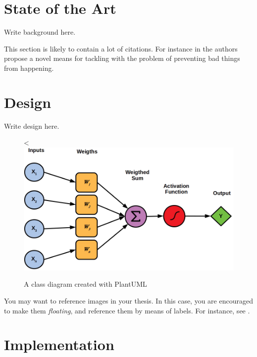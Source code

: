 \documentclass[12pt,a4paper,openright,twoside]{book}
\begin{document}
\chapter{State of the Art} %
\label{chap:background}

Write background here.

This section is likely to contain a lot of citations.
%
For instance in \cite{AnzengruberSocInfo2013} the authors propose a novel means for tackling with the problem of preventing bad things from happening.

\chapter{Design} %
\label{chap:design}

Write design here.

\begin{figure}[h] %
	\centering
	<\includegraphics[width=0.8\linewidth]{figures/neuron.png}
	\caption{A class diagram created with PlantUML}
	\label{fig:classes}
\end{figure}

You may want to reference images in your thesis.
%
In this case, you are encouraged to make them \emph{floating}, and reference them by means of labels.
%
For instance, see .
%

\chapter{Implementation} %
\label{chap:implementation}
\end{document}

